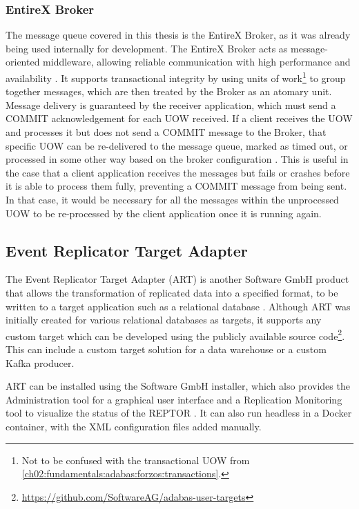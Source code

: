 \subsubsection{EntireX Broker}
\label{ch02:fundamentals:adabas:entirex}
The message queue covered in this thesis is the EntireX Broker, as it was already being used internally for development. The EntireX Broker acts as message-oriented middleware, allowing reliable communication with high performance and availability \cite{entirexbrokerintro}. It supports transactional integrity by using units of work\footnote{Not to be confused with the transactional \ac{UOW} from \ref{ch02:fundamentals:adabas:forzos:transactions}.} to group together messages, which are then treated by the Broker as an atomary unit. Message delivery is guaranteed by the receiver application, which must send a COMMIT acknowledgement for each \ac{UOW} received. If a client receives the \ac{UOW} and processes it but does not send a COMMIT message to the Broker, that specific \ac{UOW} can be re-delivered to the message queue, marked as timed out, or processed in some other way based on the broker configuration \cite{entirexbrokeradmin}. This is useful in the case that a client application receives the messages but fails or crashes before it is able to process them fully, preventing a COMMIT message from being sent. In that case, it would be necessary for all the messages within the unprocessed \ac{UOW} to be re-processed by the client application once it is running again.

\subsection{Event Replicator Target Adapter}
\label{ch02:fundamentals:adabas:art}
The Event Replicator Target Adapter (\ac{ART}) is another Software GmbH product that allows the transformation of replicated data into a specified format, to be written to a target application such as a relational database \cite{artconcepts}. Although \ac{ART} was initially created for various relational databases as targets, it supports any custom target which can be developed using the publicly available source code\footnote{\url{https://github.com/SoftwareAG/adabas-user-targets}}. This can include a custom target solution for a data warehouse or a custom Kafka producer.

\ac{ART} can be installed using the Software GmbH installer, which also provides the Administration tool for a graphical user interface and a Replication Monitoring tool to visualize the status of the \ac{REPTOR} \cite{artconcepts}. It can also run headless in a Docker container, with the XML configuration files added manually.

